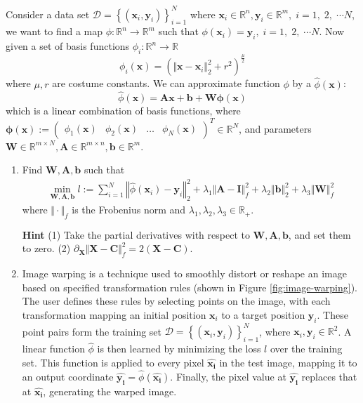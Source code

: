 \documentclass[11pt,letter,notitlepage]{article}
\begin{document}
\newpage
\begin{exercise}
Consider a data set $\mathcal{D} = \left\{\left(\mathbf{x}_i, \mathbf{y}_i\right)\right\}_{i=1}^{N}$ where $\mathbf{x}_i\in\mathbb{R}^n,\mathbf{y}_i\in\mathbb{R}^m,\; i=1,\;2,\;\dotsb N$, we want to find a map $\phi:\mathbb{R}^n\to \mathbb{R}^m$ such that
$\phi(\mathbf{x}_i) = \mathbf{y}_i,\; i=1,\;2,\;\dotsb N$.
Now given a set of basis functions $\phi_i: \mathbb{R}^n\to\mathbb{R}$
$$
\phi_i(\mathbf{x}) = \left(\Vert \mathbf{x} - \mathbf{x}_i \Vert _2^2 + r^2\right)^{\frac{\mu}{2}}
$$
where $\mu, r$ are costume constants. We can approximate function $\phi$ by a $\hat{\phi}(\mathbf{x})$:
$$
\hat{\phi}(\mathbf{x}) = \mathbf{A}\mathbf{x} + \mathbf{b} + \mathbf{W} \boldsymbol{\phi}(\mathbf{x})
$$
which is a linear combination of basis functions, where $\boldsymbol{\phi}(\mathbf{x}) := \left(\begin{matrix}\phi_1(\mathbf{x})& \phi_2(\mathbf{x}) &\dots &\phi_N(\mathbf{x})\end{matrix}\right)^T\in\mathbb{R}^N$, and parameters $\mathbf{W}\in\mathbb{R}^{m\times N}, \mathbf{A}\in\mathbb{R}^{m\times n}, \mathbf{b}\in\mathbb{R}^m$.
\begin{enumerate}
    \item Find $\mathbf{W}, \mathbf{A}, \mathbf{b}$ such that
\begin{align}
\min_{\mathbf{W}, \mathbf{A}, \mathbf{b}} l := \sum_{i = 1}^N\left\Vert \hat{\phi}(\mathbf{x}_i) - \mathbf{y}_i \right\Vert _2^2 + \lambda_1\Vert \mathbf{A} - \mathbf{I}\Vert_f^2 + \lambda_2 \Vert\mathbf{b} \Vert _2^2 + \lambda_3\Vert \mathbf{W}\Vert_f^2
\label{eq:EX6}
\end{align}
    where $\Vert \cdot\Vert_f$ is the Frobenius norm and $\lambda_1, \lambda_2, \lambda_3\in\mathbb{R}_+$.
    
    \textbf{Hint} (1) Take the partial derivatives with respect to $\mathbf{W}, \mathbf{A}, \mathbf{b}$, and set them to zero. (2) $\partial_\mathbf{X}\Vert \mathbf{X} - \mathbf{C}\Vert^2_f=2(\mathbf{X} - \mathbf{C})$.
    \item 
    
    Image warping is a technique used to smoothly distort or reshape an image based on specified transformation rules (shown in Figure \ref{fig:image-warping}). The user defines these rules by selecting points on the image, with each transformation mapping an initial position $\mathbf{x}_i$ to a target position $\mathbf{y}_i$. These point pairs form the training set $\mathcal{D} = \left\{\left(\mathbf{x}_i, \mathbf{y}_i\right)\right\}_{i=1}^{N}$, where $\mathbf{x}_i,\mathbf{y}_i \in \mathbb{R}^2$. A linear function $\hat{\phi}$ is then learned by minimizing the loss $l$ over the training set. This function is applied to every pixel $\hat{\mathbf{x_i}}$ in the test image, mapping it to an output coordinate $\hat{\mathbf{y_i}} = \hat{\phi}(\hat{\mathbf{x_i}})$. Finally, the pixel value at $\hat{\mathbf{y_i}}$ replaces that at $\hat{\mathbf{x_i}}$, generating the warped image.


\end{enumerate}
\end{exercise}
\end{document}
